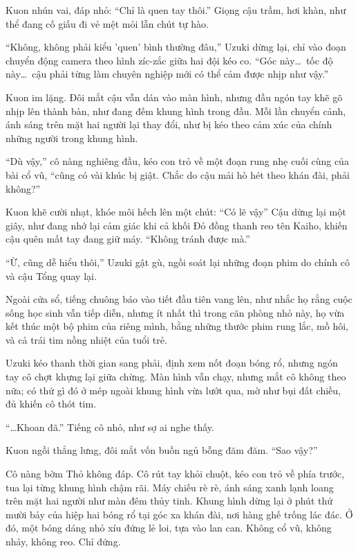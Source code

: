 \documentclass[../main.tex]{subfiles}
\begin{document}
Kuon nhún vai, đáp nhỏ: ``Chỉ là quen tay thôi.'' Giọng cậu trầm, hơi khàn, như thể đang cố giấu đi vẻ mệt mỏi lẫn chút tự hào.

``Không, không phải kiểu 'quen' bình thường đâu,'' Uzuki dừng lại, chỉ vào đoạn chuyển động camera theo hình zíc-zắc giữa hai đội kéo co. ``Góc này\dots\ tốc độ này\dots\ cậu phải từng làm chuyên nghiệp mới có thể cảm được nhịp như vậy.''

Kuon im lặng. Đôi mắt cậu vẫn dán vào màn hình, nhưng đầu ngón tay khẽ gõ nhịp lên thành bàn, như đang đếm khung hình trong đầu. Mỗi lần chuyển cảnh, ánh sáng trên mặt hai người lại thay đổi, như bị kéo theo cảm xúc của chính những người trong khung hình.

``Dù vậy,'' cô nàng nghiêng đầu, kéo con trỏ về một đoạn rung nhẹ cuối cùng của bài cổ vũ, ``cũng có vài khúc bị giật. Chắc do cậu mải hò hét theo khán đài, phải không?''

Kuon khẽ cười nhạt, khóe môi hếch lên một chút: ``Có lẽ vậy'' Cậu dừng lại một giây, như đang nhớ lại cảm giác khi cả khối Đỏ đồng thanh reo tên Kaiho, khiến cậu quên mất tay đang giữ máy. ``Không tránh được mà.''

``Ừ, cũng dễ hiểu thôi,'' Uzuki gật gù, ngồi soát lại những đoạn phim do chính cô và cậu Tổng quay lại.

Ngoài cửa sổ, tiếng chuông báo vào tiết đầu tiên vang lên, như nhắc họ rằng cuộc sống học sinh vẫn tiếp diễn, nhưng ít nhất thì trong căn phòng nhỏ này, họ vừa kết thúc một bộ phim của riêng mình, bằng những thước phim rung lắc, mồ hôi, và cả trái tim nồng nhiệt của tuổi trẻ.

Uzuki kéo thanh thời gian sang phải, định xem nốt đoạn bóng rổ, nhưng ngón tay cô chợt khựng lại giữa chừng. Màn hình vẫn chạy, nhưng mắt cô không theo nữa; có thứ gì đó ở mép ngoài khung hình vừa lướt qua, mờ như bụi đất chiều, đủ khiến cô thót tim.

``\dots Khoan đã.'' Tiếng cô nhỏ, như sợ ai nghe thấy.

Kuon ngồi thẳng lưng, đôi mắt vốn buồn ngủ bỗng đăm đăm. ``Sao vậy?''

Cô nàng bờm Thỏ không đáp. Cô rút tay khỏi chuột, kéo con trỏ về phía trước, tua lại từng khung hình chậm rãi. Máy chiếu rè rè, ánh sáng xanh lạnh loang trên mặt hai người như màn đêm thủy tinh. Khung hình dừng lại ở phút thứ mười bảy của hiệp hai bóng rổ tại góc xa khán đài, nơi hàng ghế trống lác đác. Ở đó, một bóng dáng nhỏ xíu đứng lẻ loi, tựa vào lan can. Không cổ vũ, không nhảy, không reo. Chỉ đứng.
\end{document}
